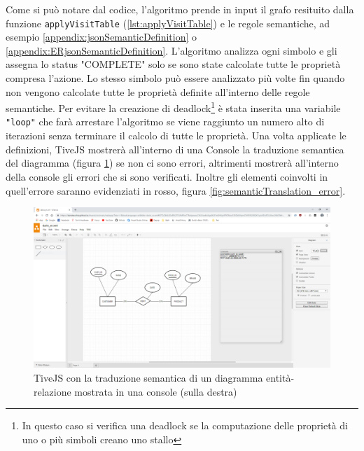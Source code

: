                 Come si può notare dal codice, l'algoritmo prende in input il grafo resituito dalla funzione \texttt{applyVisitTable} (\ref{lst:applyVisitTable}) e le regole semantiche, ad esempio \ref{appendix:jsonSemanticDefinition} o \ref{appendix:ERjsonSemanticDefinition}.
                L'algoritmo analizza ogni simbolo e gli assegna lo status "COMPLETE" solo se sono state calcolate tutte le proprietà compresa l'azione. Lo stesso simbolo può essere analizzato più volte fin quando non vengono calcolate tutte le proprietà definite all'interno delle regole semantiche. Per evitare la creazione di deadlock\footnote{In questo caso si verifica una deadlock se la computazione delle proprietà di uno o più simboli creano uno stallo} è stata inserita una variabile \texttt{"loop"} che farà arrestare l'algoritmo se viene raggiunto un numero alto di iterazioni senza terminare il calcolo di tutte le proprietà.
                \newline
                Una volta applicate le definizioni, TiveJS mostrerà all'interno di una Console la traduzione semantica del diagramma (figura \ref{fig:semanticTranslation}) se non ci sono errori, altrimenti mostrerà all'interno della console gli errori che si sono verificati. Inoltre gli elementi coinvolti in quell'errore saranno evidenziati in rosso, figura \ref{fig:semanticTranslation_error}.
                \begin{figure}[htbp]
                    \centering
                    \includegraphics[scale=0.25]{Figure/semanticTranslation.PNG}
                    \caption{TiveJS con la traduzione semantica di un diagramma entità-relazione mostrata in una console (sulla destra)}
                    \label{fig:semanticTranslation}
                \end{figure}

